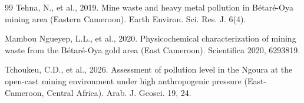 \documentclass[preprint,12pt,authoryear]{elsarticle}
\begin{document}
\begin{thebibliography}{99}
Tehna, N., et al., 2019. Mine waste and heavy metal pollution in B\'{e}tar\'{e}-Oya mining area (Eastern Cameroon). Earth Environ. Sci. Res. J. 6(4).

Mambou Ngueyep, L.L., et al., 2020. Physicochemical characterization of mining waste from the B\'{e}tar\'{e}-Oya gold area (East Cameroon). Scientifica 2020, 6293819.

Tchoukeu, C.D., et al., 2026. Assessment of pollution level in the Ngoura at the open-cast mining environment under high anthropogenic pressure (East-Cameroon, Central Africa). Arab. J. Geosci. 19, 24.

\end{thebibliography}
\end{document}
